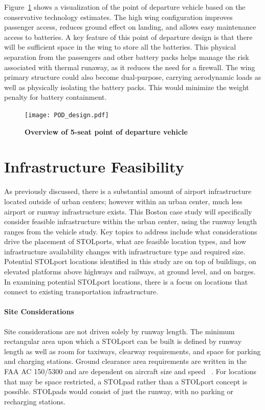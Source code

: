 \documentclass[]{aiaa-tc}%
\begin{document}
Figure~\ref{f:vehicle} shows a visualization of the point of departure vehicle based on the conservative technology estimates.  The high wing configuration improves passenger access, reduces ground effect on landing, and allows easy maintenance access to batteries.  A key feature of this point of departure design is that there will be sufficient space in the wing to store all the batteries.  This physical separation from the passengers and other battery packs helps manage the risk associated with thermal runaway, as it reduces the need for a firewall.  The wing primary structure could also become dual-purpose, carrying aerodynamic loads as well as physically isolating the battery packs.  This would minimize the weight penalty for battery containment. 
\begin{figure}[h!]
 
     \texttt{[image: POD\_design.pdf]}
 
    \caption{\textbf{Overview of 5-seat point of departure vehicle}}
 \label{f:vehicle}
 \end{figure}

\section{Infrastructure Feasibility}
As previously discussed, there is a substantial amount of airport infrastructure located outside of urban centers; however within an urban center, much less airport or runway infrastructure exists. This Boston case study will specifically consider feasible infrastructure within the urban center, using the runway length ranges from the vehicle study.  Key topics to address include what considerations drive the placement of STOLports, what are feasible location types, and how infrastructure availability changes with infrastructure type and required size.  Potential STOLport locations identified in this study  are on top of buildings, on elevated platforms above highways and railways, at ground level, and on barges. In examining potential STOLport locations, there is a focus on locations that connect to existing transportation infrastructure.

\paragraph{Site Considerations}
Site considerations are not driven solely by runway length. The minimum rectangular area upon which a STOLport can be built is defined by runway length as well as room for taxiways, clearway requirements, and space for parking and charging stations. Ground clearance area requirements are written in the FAA AC 150/5300 and are dependent on aircraft size and speed ~\cite{AC150}. For locations that may be space restricted, a STOLpad rather than a STOLport concept is possible.  STOLpads would consist of just the runway, with no parking or recharging stations. 
\end{document}
